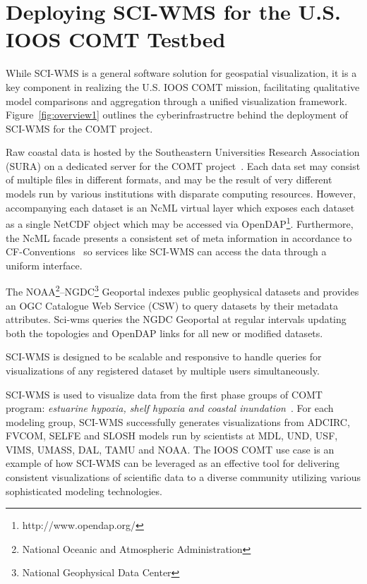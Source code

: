 \documentclass[11pt,twocolumn,twoside]{IEEEtran}
\newcommand{\comt}{COMT}
\newcommand{\ioos}{IOOS}
\newcommand{\sura}{SURA}
\newcommand{\ogc}{OGC}
\newcommand{\csw}{CSW}
\newcommand{\ncml}{NcML}
\newcommand{\noaa}{NOAA}
\newcommand{\ngdc}{NGDC}
\newcommand{\opendap}{OpenDAP}
\newcommand{\netcdf}{NetCDF}
\newcommand{\sciwms}{SCI-WMS}
\newcommand{\Sciwms}{SCI-WMS}
\newcommand{\adcirc}{ADCIRC}
\newcommand{\fvcom}{FVCOM}
\newcommand{\selfe}{SELFE}
\newcommand{\slosh}{SLOSH}
\newcommand{\mdl}{MDL}
\newcommand{\und}{UND}
\newcommand{\usf}{USF}
\newcommand{\vims}{VIMS}
\newcommand{\umass}{UMASS}
\newcommand{\dal}{DAL}
\newcommand{\tamu}{TAMU}
\begin{document}
\section{Deploying \sciwms{} for the U.S. \ioos{} \comt{} Testbed}
While \sciwms{} is a general software solution for geospatial
visualization, it is a key component in realizing the U.S. \ioos{}
\comt{} mission, facilitating qualitative model comparisons and
aggregation through a unified visualization
framework. Figure~\ref{fig:overview1} outlines the cyberinfrastructre
behind the deployment of \sciwms{} for the \comt{} project.

Raw coastal data is hosted by the Southeastern Universities Research
Association (\sura{}) on a dedicated server for the \comt{}
project~\cite{luettich12}. Each data set may consist of multiple files
in different formats, and may be the result of very different models
run by various institutions with disparate computing
resources. However, accompanying each dataset is an \ncml{} virtual
layer which exposes each dataset as a single \netcdf{} object which
may be accessed via
\opendap{}\footnote{http://www.opendap.org/}. Furthermore, the \ncml{}
facade presents a consistent set of meta information in accordance to
CF-Conventions~\cite{cf} so services like \sciwms{} can access the
data through a uniform interface.

The \noaa{}\footnote{National Oceanic and Atmospheric Administration}--\ngdc{}\footnote{National Geophysical
Data Center} Geoportal indexes public geophysical datasets and provides an \ogc{} Catalogue Web Service (\csw{})
to query datasets by their metadata attributes. Sci-wms queries the \ngdc{} Geoportal at regular intervals
updating both the topologies and \opendap{} links for all new or modified datasets.

\sciwms{} is designed to be scalable and responsive to handle queries for visualizations of
any registered dataset by multiple users simultaneously.

\Sciwms{} is used to visualize data from the first phase groups
of \comt{} program: {\em estuarine hypoxia, shelf hypoxia and coastal
 inundation}~\cite{luettich13}. For each modeling group,
\sciwms{} successfully generates visualizations from
\adcirc{}, \fvcom{}, \selfe{} and \slosh{} models run by scientists at
\mdl{}, \und{}, \usf{}, \vims{}, \umass{}, \dal{}, \tamu{} and
\noaa{}. The \ioos{} \comt{} use case is an example of how \sciwms{}
can be leveraged as an effective tool for delivering consistent
visualizations of scientific data to a diverse community utilizing
various sophisticated modeling technologies.
\end{document}
